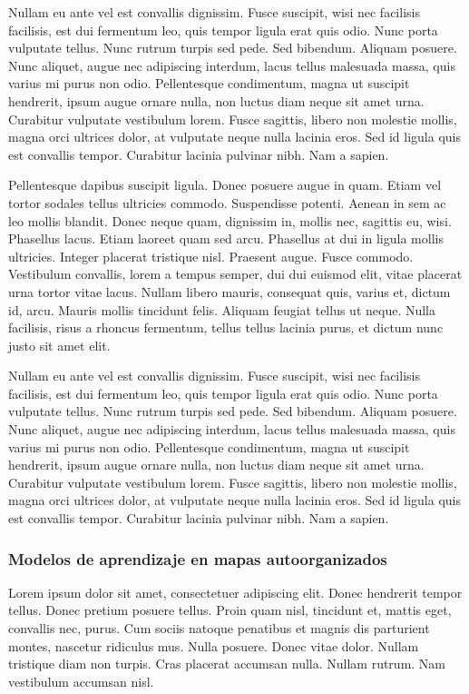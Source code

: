 Nullam eu ante vel est convallis dignissim.  Fusce suscipit, wisi nec
facilisis facilisis, est dui fermentum leo, quis tempor ligula erat
quis odio.  Nunc porta vulputate tellus.  Nunc rutrum turpis sed pede.
Sed bibendum.  Aliquam posuere.  Nunc aliquet, augue nec adipiscing
interdum, lacus tellus malesuada massa, quis varius mi purus non odio.
Pellentesque condimentum, magna ut suscipit hendrerit, ipsum augue
ornare nulla, non luctus diam neque sit amet urna.  Curabitur
vulputate vestibulum lorem.  Fusce sagittis, libero non molestie
mollis, magna orci ultrices dolor, at vulputate neque nulla lacinia
eros.  Sed id ligula quis est convallis tempor.  Curabitur lacinia
pulvinar nibh.  Nam a sapien.



Pellentesque dapibus suscipit ligula.  Donec posuere augue in quam.
Etiam vel tortor sodales tellus ultricies commodo.  Suspendisse
potenti.  Aenean in sem ac leo mollis blandit.  Donec neque quam,
dignissim in, mollis nec, sagittis eu, wisi.  Phasellus lacus.  Etiam
laoreet quam sed arcu.  Phasellus at dui in ligula mollis ultricies.
Integer placerat tristique nisl.  Praesent augue.  Fusce commodo.
Vestibulum convallis, lorem a tempus semper, dui dui euismod elit,
vitae placerat urna tortor vitae lacus.  Nullam libero mauris,
consequat quis, varius et, dictum id, arcu.  Mauris mollis tincidunt
felis.  Aliquam feugiat tellus ut neque.  Nulla facilisis, risus a
rhoncus fermentum, tellus tellus lacinia purus, et dictum nunc justo
sit amet elit.

Nullam eu ante vel est convallis dignissim.  Fusce suscipit, wisi nec
facilisis facilisis, est dui fermentum leo, quis tempor ligula erat
quis odio.  Nunc porta vulputate tellus.  Nunc rutrum turpis sed pede.
Sed bibendum.  Aliquam posuere.  Nunc aliquet, augue nec adipiscing
interdum, lacus tellus malesuada massa, quis varius mi purus non odio.
Pellentesque condimentum, magna ut suscipit hendrerit, ipsum augue
ornare nulla, non luctus diam neque sit amet urna.  Curabitur
vulputate vestibulum lorem.  Fusce sagittis, libero non molestie
mollis, magna orci ultrices dolor, at vulputate neque nulla lacinia
eros.  Sed id ligula quis est convallis tempor.  Curabitur lacinia
pulvinar nibh.  Nam a sapien.


\subsubsection{Modelos de aprendizaje en mapas autoorganizados}

Lorem ipsum dolor sit amet, consectetuer adipiscing elit.  Donec
hendrerit tempor tellus.  Donec pretium posuere tellus.  Proin quam
nisl, tincidunt et, mattis eget, convallis nec, purus.  Cum sociis
natoque penatibus et magnis dis parturient montes, nascetur ridiculus
mus.  Nulla posuere.  Donec vitae dolor.  Nullam tristique diam non
turpis.  Cras placerat accumsan nulla.  Nullam rutrum.  Nam vestibulum
accumsan nisl.

